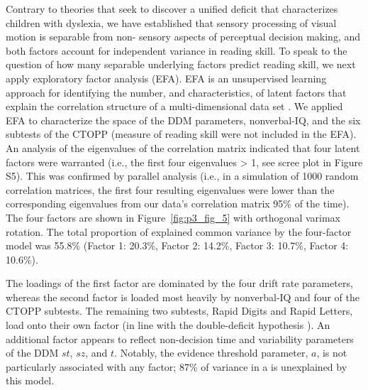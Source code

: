 \documentclass[../uwthesis.tex]{subfiles}
\begin{document}
Contrary to theories that seek to discover a unified deficit that characterizes children with
dyslexia, we have established that sensory processing of visual motion is separable from non-
sensory aspects of perceptual decision making, and both factors account for independent variance
in reading skill. To speak to the question of how many separable underlying factors predict reading
skill, we next apply exploratory factor analysis (EFA). EFA is an unsupervised learning approach
for identifying the number, and characteristics, of latent factors that explain the correlation
structure of a multi-dimensional data set \cite{Ferguson1993ExploratoryUsersGuide,Costello2005BestAnalysis,Kline2013ExploratoryAnalysis}. We applied EFA to characterize the space of the DDM parameters, nonverbal-IQ, and the six subtests of the CTOPP (measure of reading skill were not included in the EFA). An analysis of the eigenvalues of the correlation matrix indicated that
four latent factors were warranted (i.e., the first four eigenvalues > 1, see scree plot in Figure S5).
This was confirmed by parallel analysis \cite{Hayton2004FactorAnalysis} (i.e., in a simulation of 1000 random correlation matrices, the first four resulting eigenvalues were lower than the corresponding eigenvalues from
our data’s correlation matrix 95\% of the time). The four factors are shown in Figure~\ref{fig:p3_fig_5} with
orthogonal varimax rotation. The total proportion of explained common variance by the four-factor
model was 55.8\% (Factor 1: 20.3\%, Factor 2: 14.2\%, Factor 3: 10.7\%, Factor 4: 10.6\%).

The loadings of the first factor are dominated by the four drift rate parameters, whereas the
second factor is loaded most heavily by nonverbal-IQ and four of the CTOPP subtests. The
remaining two subtests, Rapid Digits and Rapid Letters, load onto their own factor (in line with
the double-deficit hypothesis \cite{Wolf2000Naming-speedHypothesis}). An additional factor appears to reflect non-decision time and variability parameters of the DDM $st$, $sz$, and $t$. Notably, the evidence threshold parameter, $a$, is not particularly associated with any factor; 87\% of variance in a is unexplained by this model.
\end{document}
